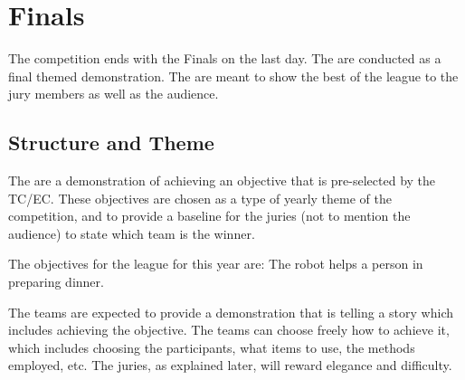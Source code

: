 \chapter{Finals}
\label{chap:finals}

The competition ends with the Finals on the last day.
The  are conducted as a final themed demonstration.
The  are meant to show the best of the league to the jury members as well as the audience.

\section{Structure and Theme}

The  are a demonstration of achieving an objective that is pre-selected by the TC/EC. These objectives are chosen as a type of yearly theme of the competition, and to provide a baseline for the juries (not to mention the audience) to state which team is the winner.

The objectives for the league for this year are:
The robot helps a person in preparing dinner.



The teams are expected to provide a demonstration that is telling a story which includes achieving the objective. The teams can choose freely how to achieve it, which includes choosing the participants, what items to use, the methods employed, etc. The juries, as explained later, will reward elegance and difficulty.

